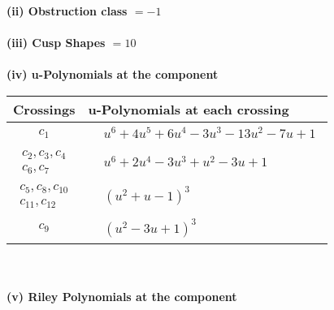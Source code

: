 \documentclass[1p]{elsarticle_modified}
\theoremstyle{definition}
\begin{document}
\flushleft \textbf{(ii) Obstruction class $= -1$}\\~\\
\flushleft \textbf{(iii) Cusp Shapes $= 10$}\\~\\
\newpage\renewcommand{\arraystretch}{1}
\flushleft \textbf{(iv) u-Polynomials at the component}\newline \\
\begin{tabular}{m{50pt}|m{274pt}}
Crossings & \hspace{64pt}u-Polynomials at each crossing \\
\hline $$\begin{aligned}c_{1}\end{aligned}$$&$\begin{aligned}
&u^6+4 u^5+6 u^4-3 u^3-13 u^2-7 u+1
\end{aligned}$\\
\hline $$\begin{aligned}c_{2},c_{3},c_{4}\\c_{6},c_{7}\end{aligned}$$&$\begin{aligned}
&u^6+2 u^4-3 u^3+u^2-3 u+1
\end{aligned}$\\
\hline $$\begin{aligned}c_{5},c_{8},c_{10}\\c_{11},c_{12}\end{aligned}$$&$\begin{aligned}
&(u^2+u-1)^3
\end{aligned}$\\
\hline $$\begin{aligned}c_{9}\end{aligned}$$&$\begin{aligned}
&(u^2-3 u+1)^3
\end{aligned}$\\
\hline
\end{tabular}\\~\\
\newpage\renewcommand{\arraystretch}{1}
\flushleft \textbf{(v) Riley Polynomials at the component}\newline \\
\end{document}
